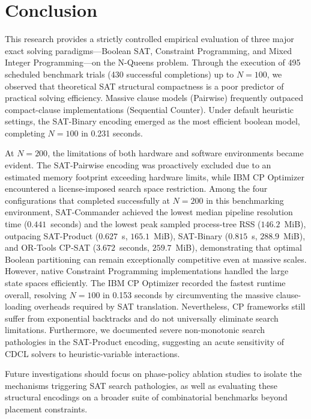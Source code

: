 \section{Conclusion}
\label{sec:conclusion}

This research provides a strictly controlled empirical evaluation of three major exact solving paradigms---Boolean SAT, Constraint Programming, and Mixed Integer Programming---on the N-Queens problem. Through the execution of 495 scheduled benchmark trials (430 successful completions) up to $N=100$, we observed that theoretical SAT structural compactness is a poor predictor of practical solving efficiency. Massive clause models (Pairwise) frequently outpaced compact-clause implementations (Sequential Counter). Under default heuristic settings, the SAT-Binary encoding emerged as the most efficient boolean model, completing $N=100$ in 0.231 seconds.

At $N=200$, the limitations of both hardware and software environments became evident. The SAT-Pairwise encoding was proactively excluded due to an estimated memory footprint exceeding hardware limits, while IBM CP Optimizer encountered a license-imposed search space restriction. Among the four configurations that completed successfully at $N=200$ in this benchmarking environment, SAT-Commander achieved the lowest median pipeline resolution time ($0.441$~seconds) and the lowest peak sampled process-tree RSS ($146.2$~MiB), outpacing SAT-Product ($0.627$~s, $165.1$~MiB), SAT-Binary ($0.815$~s, $288.9$~MiB), and OR-Tools CP-SAT ($3.672$~seconds, $259.7$~MiB), demonstrating that optimal Boolean partitioning can remain exceptionally competitive even at massive scales.
However, native Constraint Programming implementations handled the large state spaces efficiently. The IBM CP Optimizer recorded the fastest runtime overall, resolving $N=100$ in 0.153 seconds by circumventing the massive clause-loading overheads required by SAT translation. Nevertheless, CP frameworks still suffer from exponential backtracks and do not universally eliminate search limitations. Furthermore, we documented severe non-monotonic search pathologies in the SAT-Product encoding, suggesting an acute sensitivity of CDCL solvers to heuristic-variable interactions. 

Future investigations should focus on phase-policy ablation studies to isolate the mechanisms triggering SAT search pathologies, as well as evaluating these structural encodings on a broader suite of combinatorial benchmarks beyond placement constraints.

